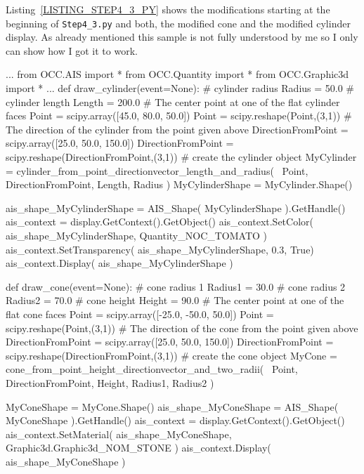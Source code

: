 Listing~\ref{LISTING_STEP4_3_PY} shows the modifications starting at the beginning of {\tt Step4\_3.py} and both, the modified cone and the modified cylinder display.
As already mentioned this sample is not fully understood by me so I only can show how I got it to work.
%
\begin{python}[moreemph={[4], 46, 48},caption={Step4\_1.py - Creating the display},label=LISTING_STEP4_3_PY]
...
from OCC.AIS import *
from OCC.Quantity import *
from OCC.Graphic3d import *
...
def draw_cylinder(event=None):
    # cylinder radius
    Radius = 50.0
    # cylinder length
    Length = 200.0
    # The center point at one of the flat cylinder faces 
    Point = scipy.array([45.0, 80.0, 50.0])
    Point = scipy.reshape(Point,(3,1))
    # The direction of the cylinder from the point given above 
    DirectionFromPoint = scipy.array([25.0, 50.0, 150.0])
    DirectionFromPoint = scipy.reshape(DirectionFromPoint,(3,1))
    # create the cylinder object
    MyCylinder = cylinder_from_point_directionvector_length_and_radius( \
                                                            Point, 
																				DirectionFromPoint,
                                                            Length,
                                                            Radius )
    MyCylinderShape = MyCylinder.Shape()
    
    ais_shape_MyCylinderShape = AIS_Shape( MyCylinderShape ).GetHandle()
    ais_context = display.GetContext().GetObject()
    ais_context.SetColor(  ais_shape_MyCylinderShape,  Quantity_NOC_TOMATO )
    ais_context.SetTransparency( ais_shape_MyCylinderShape, 0.3, True)
    ais_context.Display( ais_shape_MyCylinderShape ) 

def draw_cone(event=None):
    # cone radius 1
    Radius1 = 30.0
    # cone radius 2
    Radius2 = 70.0
    # cone height
    Height = 90.0
    # The center point at one of the flat cone faces 
    Point = scipy.array([-25.0, -50.0, 50.0])
    Point = scipy.reshape(Point,(3,1))
    # The direction of the cone from the point given above 
    DirectionFromPoint = scipy.array([25.0, 50.0, 150.0])
    DirectionFromPoint = scipy.reshape(DirectionFromPoint,(3,1))
    # create the cone object
    MyCone = cone_from_point_height_directionvector_and_two_radii( \
                                                            Point, 
                                                            DirectionFromPoint,
                                                            Height,
                                                            Radius1,
                                                            Radius2 )

    MyConeShape = MyCone.Shape()
    ais_shape_MyConeShape = AIS_Shape( MyConeShape ).GetHandle()
    ais_context = display.GetContext().GetObject()
    ais_context.SetMaterial(    ais_shape_MyConeShape,  
                                Graphic3d.Graphic3d_NOM_STONE )
    ais_context.Display( ais_shape_MyConeShape ) 
\end{python}
